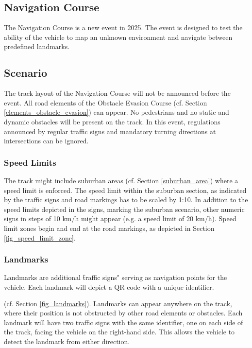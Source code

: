 
\begin{highlight}[yellow]

    \section{Navigation Course}
    \label{navigation_course}

    The Navigation Course is a new event in 2025. The event is designed to test the
    ability of the vehicle to map an unknown environment and navigate between
    predefined landmarks.

    \subsection{Scenario}

    The track layout of the Navigation Course will not be announced before the
    event. All road elements of the Obstacle Evasion Course (cf. Section
    \ref{elements_obstacle_evasion}) can appear. No pedestrians and no static and
    dynamic obstacles will be present on the track. In this event, regulations
    announced by regular traffic signs and mandatory turning directions at
    intersections can be ignored.

    \subsubsection{Speed Limits}

    The track might include suburban areas (cf. Section \ref{suburban_area}) where
    a speed limit is enforced. The speed limit within the suburban section, as
    indicated by the traffic signs and road markings has to be scaled by 1:10. In
    addition to the speed limits depicted in the signs, marking the suburban
    scenario, other numeric signs in steps of 10 km/h might appear (e.g. a speed
    limit of 20 km/h). Speed limit zones begin and end at the road markings, as
    depicted in Section \ref{fig_speed_limit_zone}.

    \subsubsection{Landmarks}
    \label{landmarks}

    Landmarks are additional \"traffic signs" serving as navigation points for the
    vehicle. Each landmark will depict a QR code with a unique identifier.

     (cf. Section \ref{fig_landmarks}).
    Landmarks can appear anywhere on the track, where their position is not 
    obstructed by other road elements or obstacles. Each landmark will have two 
    traffic signs with the same identifier, one on each side of the track, facing 
    the vehicle on the right-hand side. This allows the vehicle to detect the 
    landmark from either direction.


\end{highlight}
